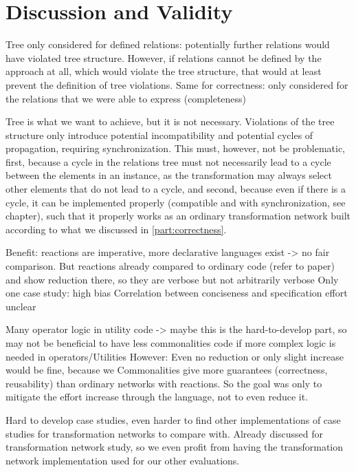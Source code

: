 \section{Discussion and Validity}

Tree only considered for defined relations: potentially further relations would have violated tree structure. However, if relations cannot be defined by the approach at all, which would violate the tree structure, that would at least prevent the definition of tree violations.
Same for correctness: only considered for the relations that we were able to express (completeness)

Tree is what we want to achieve, but it is not necessary. Violations of the tree structure only introduce potential incompatibility and potential cycles of propagation, requiring synchronization. This must, however, not be problematic, first, because a cycle in the relations tree must not necessarily lead to a cycle between the elements in an instance, as the transformation may always select other elements that do not lead to a cycle, and second, because even if there is a cycle, it can be implemented properly (compatible and with synchronization, see chapter), such that it properly works as an ordinary transformation network built according to what we discussed in \autoref{part:correctness}.

Benefit: reactions are imperative, more declarative languages exist -> no fair comparison. But reactions already compared to ordinary code (refer to paper) and show reduction there, so they are verbose but not arbitrarily verbose
Only one case study: high bias
Correlation between conciseness and specification effort unclear

Many operator logic in utility code -> maybe this is the hard-to-develop part, so may not be beneficial to have less commonalities code if more complex logic is needed in operators/Utilities
However: Even no reduction or only slight increase would be fine, because we Commonalities give more guarantees (correctness, reusability) than ordinary networks with reactions. So the goal was only to mitigate the effort increase through the language, not to even reduce it.

Hard to develop case studies, even harder to find other implementations of case studies for transformation networks to compare with.
Already discussed for transformation network study, so we even profit from having the transformation network implementation used for our other evaluations.

